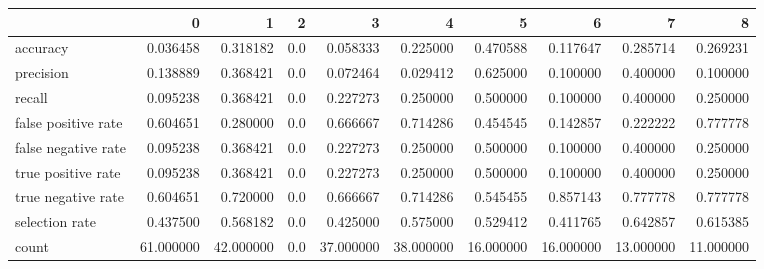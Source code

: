 \begin{tabular}{lrrrrrrrrr}
\toprule
{} &          0 &          1 &    2 &          3 &          4 &          5 &          6 &          7 &          8 \\
\midrule
accuracy            &   0.036458 &   0.318182 &  0.0 &   0.058333 &   0.225000 &   0.470588 &   0.117647 &   0.285714 &   0.269231 \\
precision           &   0.138889 &   0.368421 &  0.0 &   0.072464 &   0.029412 &   0.625000 &   0.100000 &   0.400000 &   0.100000 \\
recall              &   0.095238 &   0.368421 &  0.0 &   0.227273 &   0.250000 &   0.500000 &   0.100000 &   0.400000 &   0.250000 \\
false positive rate &   0.604651 &   0.280000 &  0.0 &   0.666667 &   0.714286 &   0.454545 &   0.142857 &   0.222222 &   0.777778 \\
false negative rate &   0.095238 &   0.368421 &  0.0 &   0.227273 &   0.250000 &   0.500000 &   0.100000 &   0.400000 &   0.250000 \\
true positive rate  &   0.095238 &   0.368421 &  0.0 &   0.227273 &   0.250000 &   0.500000 &   0.100000 &   0.400000 &   0.250000 \\
true negative rate  &   0.604651 &   0.720000 &  0.0 &   0.666667 &   0.714286 &   0.545455 &   0.857143 &   0.777778 &   0.777778 \\
selection rate      &   0.437500 &   0.568182 &  0.0 &   0.425000 &   0.575000 &   0.529412 &   0.411765 &   0.642857 &   0.615385 \\
count               &  61.000000 &  42.000000 &  0.0 &  37.000000 &  38.000000 &  16.000000 &  16.000000 &  13.000000 &  11.000000 \\
\bottomrule
\end{tabular}
